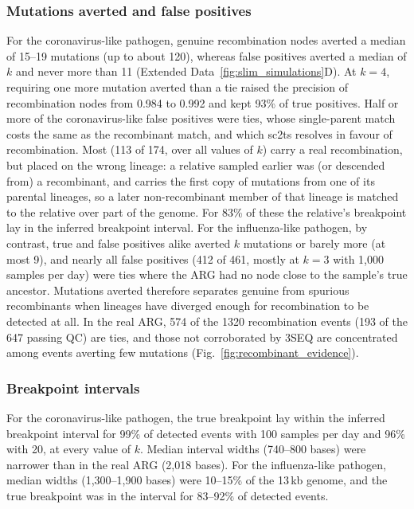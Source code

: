 \documentclass[12pt]{article}
\newcommand{\figref}[1]{Fig.~\ref{#1}}
\newcommand{\edref}[1]{Extended Data~\ref{#1}}
\begin{document}
\subsubsection{Mutations averted and false positives}
For the coronavirus-like pathogen, genuine recombination nodes
averted a median of 15--19 mutations (up to about 120),
whereas false positives averted a median of $k$ and never more than 11
(\edref{fig:slim_simulations}D).
At $k=4$, requiring one more mutation averted than a tie
raised the precision of recombination nodes from 0.984 to 0.992
and kept 93\% of true positives.
Half or more of the coronavirus-like false positives were ties,
whose single-parent match costs the same as the recombinant match,
and which sc2ts resolves in favour of recombination.
Most (113 of 174, over all values of $k$) carry a real recombination,
but placed on the wrong lineage:
a relative sampled earlier was (or descended from) a recombinant,
and carries the first copy of mutations from one of its parental lineages,
so a later non-recombinant member of that lineage is matched to the relative
over part of the genome.
For 83\% of these the relative's breakpoint lay in the inferred breakpoint interval.
For the influenza-like pathogen, by contrast,
true and false positives alike averted $k$ mutations or barely more (at most 9),
and nearly all false positives (412 of 461, mostly at $k=3$ with 1,000 samples per day)
were ties where the ARG had no node close to the sample's true ancestor.
Mutations averted therefore separates genuine from spurious recombinants
when lineages have diverged enough for recombination to be detected at all.
In the real ARG, 574 of the 1320 recombination events
(193 of the 647 passing QC) are ties,
and those not corroborated by 3SEQ are concentrated among events
averting few mutations (\figref{fig:recombinant_evidence}).

\subsubsection{Breakpoint intervals}
For the coronavirus-like pathogen, the true breakpoint lay within
the inferred breakpoint interval for 99\% of detected events
with 100 samples per day and 96\% with 20, at every value of $k$.
Median interval widths (740--800 bases) were narrower than
in the real ARG (2,018 bases).
For the influenza-like pathogen, median widths (1,300--1,900 bases)
were 10--15\% of the 13\,kb genome,
and the true breakpoint was in the interval for 83--92\% of detected events.
\end{document}
